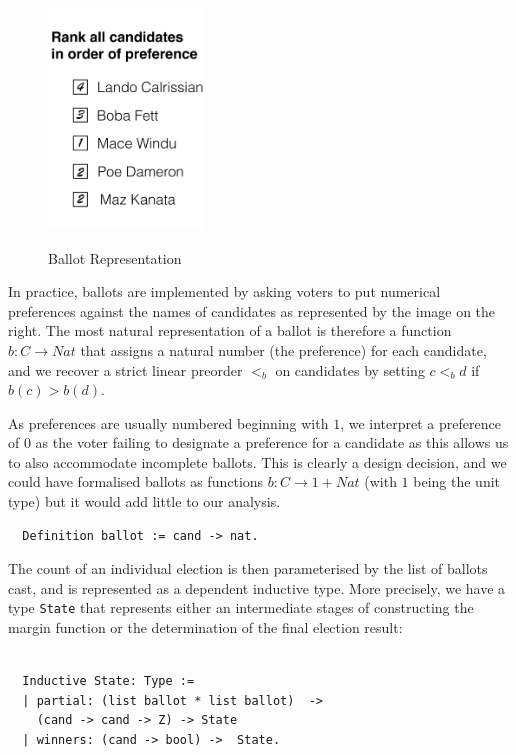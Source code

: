\begin{figure}
   \begin{center}
    {\includegraphics[width=0.37\textwidth]{bal-cropped.pdf}}
    \caption{Ballot Representation}
    \end{center}
\end{figure}
In practice, ballots are
implemented by asking voters to put numerical preferences against
the names of candidates as represented by the image on the right.
The most natural representation of a ballot is therefore a function
$b: C \to Nat$ that assigns a natural number (the preference) for
each candidate, and we recover a strict linear preorder $<_b$ on candidates
by setting $c <_b d$ if $b(c) > b(d)$. 

As preferences are usually
numbered beginning with $1$, we interpret a preference of $0$ as the
voter failing to designate a preference for a candidate
as this allows us to also accommodate incomplete ballots.
This is clearly a design decision, and we could have formalised
ballots as functions $b: C \to 1 + Nat$ (with $1$ being the unit
type) but it would add little to our analysis.
%
%
\begin{verbatim}
  Definition ballot := cand -> nat.
\end{verbatim}

\noindent
The count of an individual election is then parameterised by the list
of ballots cast, and is represented as a dependent inductive type.
More precisely, we have a type \texttt{State} that represents either
an
intermediate stages of constructing the margin function or the
determination of the final election result:
\begin{verbatim}

  Inductive State: Type :=
  | partial: (list ballot * list ballot)  -> 
    (cand -> cand -> Z) -> State
  | winners: (cand -> bool) ->  State.

\end{verbatim}

